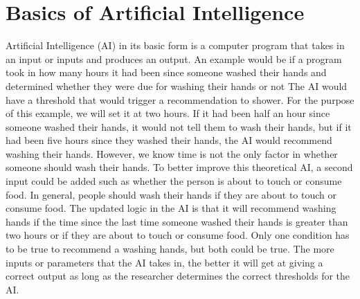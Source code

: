 \documentclass[]{article}
\begin{document}
			
	\section{Basics of Artificial Intelligence}\label{introtoai}
		
		Artificial Intelligence (AI) in its basic form is a computer program that takes in an input or inputs and produces an output.  An example would be if a program took in how many hours it had been since someone washed their hands and determined whether they were due for washing their hands or not  The AI would have a threshold that would trigger a recommendation to shower.  For the purpose of this example, we will set it at two hours.  If it had been half an hour since someone washed their hands, it would not tell them to wash their hands, but if it had been five hours since they washed their hands, the AI would recommend washing their hands.  However, we know time is not the only factor in whether someone should wash their hands.  To better improve this theoretical AI, a second input could be added such as whether the person is about to touch or consume food.  In general, people should wash their hands if they are about to touch or consume food.  The updated logic in the AI is that it will recommend washing hands if the time since the last time someone washed their hands is greater than two hours or if they are about to touch or consume food. Only one condition has to be true to recommend a washing hands, but both could be true.  The more inputs or parameters that the AI takes in, the better it will get at giving a correct output as long as the researcher determines the correct thresholds for the AI.
\end{document}
